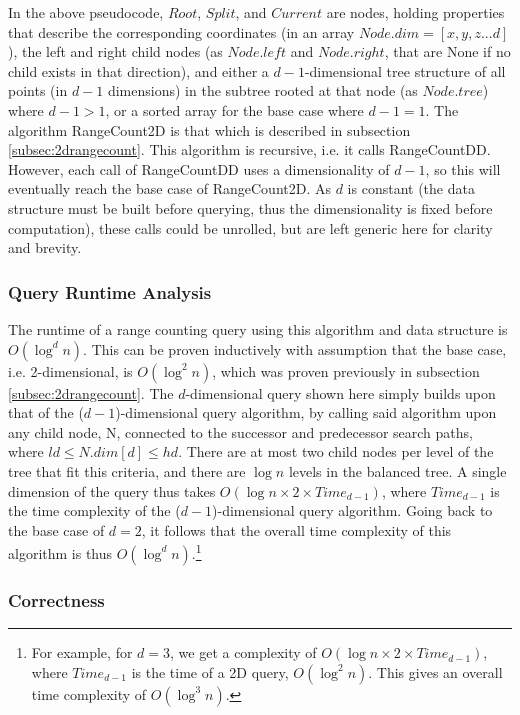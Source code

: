 \documentclass[paper=a4, fontsize=12pt]{article}
\begin{document}
In the above pseudocode, \(Root\), \(Split\), and \(Current\) are nodes, holding properties that describe the corresponding coordinates (in an array \(Node.dim = [x, y, z ... d]\)), the left and right child nodes (as \(Node.left\) and \(Node.right\), that are None if no child exists in that direction), and either a \(d-1\)-dimensional tree structure of all points (in \(d-1\) dimensions) in the subtree rooted at that node (as \(Node.tree\)) where \(d-1 > 1\), or a sorted array for the base case where \(d-1 = 1\). The algorithm RangeCount2D is that which is described in subsection \ref{subsec:2drangecount}. This algorithm is recursive, i.e. it calls RangeCountDD. However, each call of RangeCountDD uses a dimensionality of \(d-1\), so this will eventually reach the base case of RangeCount2D. As \(d\) is constant (the data structure must be built before querying, thus the dimensionality is fixed before computation), these calls could be unrolled, but are left generic here for clarity and brevity.

\subsubsection{Query Runtime Analysis}

The runtime of a range counting query using this algorithm and data structure is \(O(\log^d n)\). This can be proven inductively with assumption that the base case, i.e. 2-dimensional, is \(O(\log^2 n)\), which was proven previously in subsection \ref{subsec:2drangecount}. The \(d\)-dimensional query shown here simply builds upon that of the (\(d-1\))-dimensional query algorithm, by calling said algorithm upon any child node, N, connected to the successor and predecessor search paths, where \(ld \leq N.dim[d] \leq hd\). There are at most two child nodes per level of the tree that fit this criteria, and there are \(\log n\) levels in the balanced tree. A single dimension of the query thus takes \(O(\log n \times 2 \times Time_{d-1})\), where \(Time_{d-1}\) is the time complexity of the (\(d-1\))-dimensional query algorithm. Going back to the base case of \(d=2\), it follows that the overall time complexity of this algorithm is thus \(O(\log^d n)\).\footnote{For example, for \(d=3\), we get a complexity of \(O(\log n \times 2 \times Time_{d-1})\), where \(Time_{d-1}\) is the time of a 2D query, \(O(\log^2 n)\). This gives an overall time complexity of \(O(\log^3 n)\).}

\subsubsection{Correctness}
\end{document}
